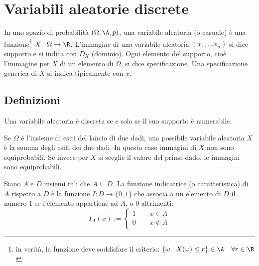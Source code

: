 %
%
%
%


\section{Variabili aleatorie discrete}
\begin{defin}
	In uno spazio di probabilità $(\Omega, \A, p)$, una variabile aleatoria (o casuale) è una funzione\footnote{in verità, la funzione deve soddisfare il criterio: $\{\omega \mid X(\omega)\leq r\}\in\A\quad\forall r\in\R$} $X:\Omega\to \R$.
	L'immagine di una variabile aleatoria $(x_1, ... x_n)$ si dice supporto e si indica con $D_X$ (dominio). Ogni elemento del supporto, cioè l'immagine per $X$ di un elemento di $\Omega$, si dice specificazione. Una specificazione generica di $X$ si indica tipicamente con $x$.
\end{defin}


\subsection{Definizioni}
\begin{defin}
	Una variabile aleatoria è discreta se e solo se il suo supporto è numerabile.
\end{defin}

\begin{examp}
	Se $\Omega$ è l'insieme di esiti del lancio di due dadi, una possibile variabile aleatoria $X$ è la somma degli esiti dei due dadi. In questo caso immagini di $X$ non sono equiprobabili. Se invece per $X$ si sceglie il valore del primo dado, le immagini sono equiprobabili.
\end{examp}

\begin{defin}
	Siano $A$ e $D$ insiemi tali che $A\subseteq D$. La funzione indicatrice (o caratteristica) di $A$ rispetto a $D$ è la funzione $I:D\to \{0,1\}$ che associa a un elemento di $D$ il numero $1$ se l'elemento appartiene ad $A$, o $0$ altrimenti:
	\begin{equation*}
		I_A(x) := \begin{cases}
			1 \qquad x\in A \\
			0 \qquad x\notin A
		\end{cases}
	\end{equation*}
\end{defin}

